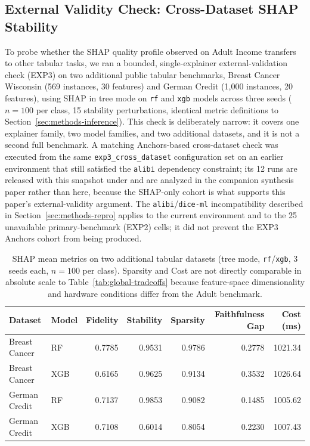 \documentclass[twoside,11pt]{article}
\begin{document}
\subsection{External Validity Check: Cross-Dataset SHAP Stability}
\label{sec:exp3}
To probe whether the SHAP quality profile observed on Adult Income transfers to
other tabular tasks, we ran a bounded, single-explainer external-validation
check (EXP3) on two additional public tabular benchmarks, Breast Cancer
Wisconsin \citep{breastcancerwisconsin} (569 instances, 30 features) and German
Credit \citep{germancredit} (1{,}000 instances, 20 features), using SHAP in
tree mode on \texttt{rf} and \texttt{xgb} models across three seeds
($n{=}100$ per class, 15 stability perturbations, identical metric
definitions to Section~\ref{sec:methods-inference}). This check is
deliberately narrow: it covers one explainer family, two model families, and
two additional datasets, and it is not a second full benchmark. A
matching Anchors-based cross-dataset check was executed from the same
\texttt{exp3\_cross\_dataset} configuration set on an earlier environment that
still satisfied the \texttt{alibi} dependency constraint; its 12 runs are
released with this snapshot under
 and are
analyzed in the companion synthesis paper rather than here, because the
SHAP-only cohort is what supports this paper's external-validity argument.
The \texttt{alibi}/\texttt{dice-ml} incompatibility described in
Section~\ref{sec:methods-repro} applies to the current environment and to the
25 unavailable primary-benchmark (EXP2) cells; it did not prevent the EXP3
Anchors cohort from being produced.
\begin{table}[h]
\centering
\caption{SHAP mean metrics on two additional tabular datasets (tree mode,
\texttt{rf}/\texttt{xgb}, 3 seeds each, $n{=}100$ per class). Sparsity and
Cost are not directly comparable in absolute scale to
Table~\ref{tab:global-tradeoffs} because feature-space dimensionality and
hardware conditions differ from the Adult benchmark.}
\begin{tabular}{llrrrrr}
\toprule
Dataset & Model & Fidelity & Stability & Sparsity & Faithfulness Gap & Cost (ms) \\
\midrule
Breast Cancer & RF  & 0.7785 & 0.9531 & 0.9786 & 0.2778 & 1021.34 \\
Breast Cancer & XGB & 0.6165 & 0.9625 & 0.9134 & 0.3532 & 1026.64 \\
German Credit & RF  & 0.7137 & 0.9853 & 0.9082 & 0.1485 & 1005.62 \\
German Credit & XGB & 0.7108 & 0.6014 & 0.8054 & 0.2230 & 1007.43 \\
\bottomrule
\end{tabular}
\label{tab:exp3-shap}
\end{table}
\end{document}
